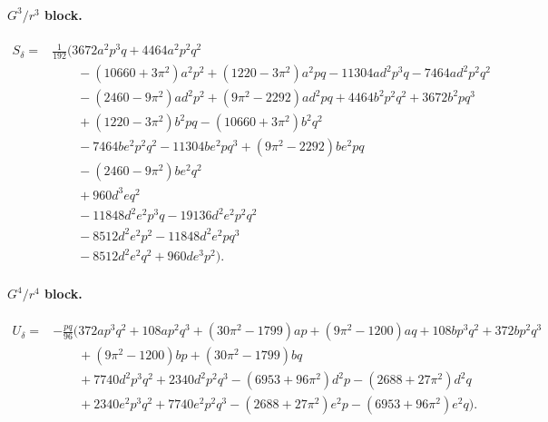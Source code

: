 \documentclass[11pt]{article}
\begin{document}
\paragraph{$G^3/r^3$ block.}
\begin{equation}
\begin{aligned}
S_\delta={}&\frac{1}{192}\Big(
3672 a^2 p^3 q + 4464 a^2 p^2 q^2
\\
&\hspace{2em}- (10660+3\pi^2)a^2 p^2 + (1220-3\pi^2)a^2 p q
- 11304 a d^2 p^3 q - 7464 a d^2 p^2 q^2
\\
&\hspace{2em}- (2460-9\pi^2)a d^2 p^2 + (9\pi^2-2292)a d^2 p q
+ 4464 b^2 p^2 q^2 + 3672 b^2 p q^3
\\
&\hspace{2em}+ (1220-3\pi^2)b^2 p q - (10660+3\pi^2)b^2 q^2
\\
&\hspace{2em}- 7464 b e^2 p^2 q^2 - 11304 b e^2 p q^3
+ (9\pi^2-2292)b e^2 p q
\\
&\hspace{2em}- (2460-9\pi^2)b e^2 q^2
\\
&\hspace{2em}+ 960 d^3 e q^2
\\
&\hspace{2em}- 11848 d^2 e^2 p^3 q - 19136 d^2 e^2 p^2 q^2
\\
&\hspace{2em}- 8512 d^2 e^2 p^2 - 11848 d^2 e^2 p q^3
\\
&\hspace{2em}- 8512 d^2 e^2 q^2 + 960 d e^3 p^2
\Big).
\end{aligned}
\label{eq:app-structured-aligned-seed-Sdelta}
\end{equation}

\paragraph{$G^4/r^4$ block.}
\begin{equation}
\begin{aligned}
U_\delta={}&-\frac{pq}{96}\Big(
372 a p^3 q^2 + 108 a p^2 q^3 + (30\pi^2-1799)a p + (9\pi^2-1200)a q
+ 108 b p^3 q^2 + 372 b p^2 q^3
\\
&\hspace{2em}+ (9\pi^2-1200)b p + (30\pi^2-1799)b q
\\
&\hspace{2em}+ 7740 d^2 p^3 q^2 + 2340 d^2 p^2 q^3
- (6953+96\pi^2)d^2 p - (2688+27\pi^2)d^2 q
\\
&\hspace{2em}+ 2340 e^2 p^3 q^2 + 7740 e^2 p^2 q^3
- (2688+27\pi^2)e^2 p - (6953+96\pi^2)e^2 q
\Big).
\end{aligned}
\label{eq:app-structured-aligned-seed-Udelta}
\end{equation}
\end{document}
